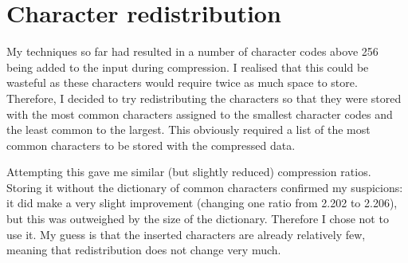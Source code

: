 \documentclass[11pt]{article} %
\begin{document}
\section{Character redistribution}
My techniques so far had resulted in a number of character codes above 256 being added to the input during compression. I realised that this could be wasteful as these characters would require twice as much space to store. Therefore, I decided to try redistributing the characters so that they were stored with the most common characters assigned to the smallest character codes and the least common to the largest. This obviously required a list of the most common characters to be stored with the compressed data.

Attempting this gave me similar (but slightly reduced) compression ratios. Storing it without the dictionary of common characters confirmed my suspicions: it did make a very slight improvement (changing one ratio from 2.202 to 2.206), but this was outweighed by the size of the dictionary. Therefore I chose not to use it. My guess is that the inserted characters are already relatively few, meaning that redistribution does not change very much.
\end{document}
